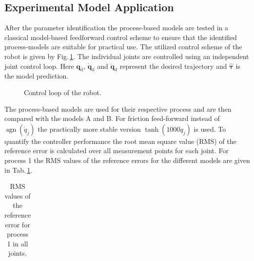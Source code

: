 
\subsection{Experimental Model Application}


After the parameter identification the process-based models are tested in a classical model-based feedforward control scheme to ensure that the identified process-models are suitable for practical use. The utilized control scheme of the robot is given by Fig.\,\ref{fig:controler}. The individual joints are controlled using an independent joint control loop. 
Here $\boldsymbol{q}_\text{d}$, $\dot{\boldsymbol{q}}_\text{d}$ and $\ddot{\boldsymbol{q}}_\text{d}$ represent the desired trajectory and $\hat{\boldsymbol{\tau}}$ is the model prediction.


\begin{figure}[tb]
  \vspace{-0.2cm}
  \centering
   
   \vspace{-0.3 cm}
  \caption{Control loop of the robot.}
  \label{fig:controler}
  \vspace{-0.2cm}
\end{figure}


The process-based models are used for their respective process and are then compared with the models A and B. For friction feed-forward instead of $\operatorname{sgn}\left(\dot{{q}}_{j}\right)$ the practically more stable version $\operatorname{tanh}\left(1000\dot{{q}}_{j}\right)$ is used. %
To quantify the controller performance the root mean square value (RMS) of the reference error is calculated over all measurement points for each joint. For process 1 the RMS values of the reference errors for the different models are given in Tab.\,\ref{tab:RefErrorProcess1}.%

\begin{table}[tb]
	\caption{RMS values of the reference error for process 1 in all joints.}\label{tab:RefErrorProcess1}
	\vspace{-0.2cm}
	\centering
	\begin{tabular}[h]{|r|c|c|c|c|}\hline
		
	\end{tabular}
\end{table}

